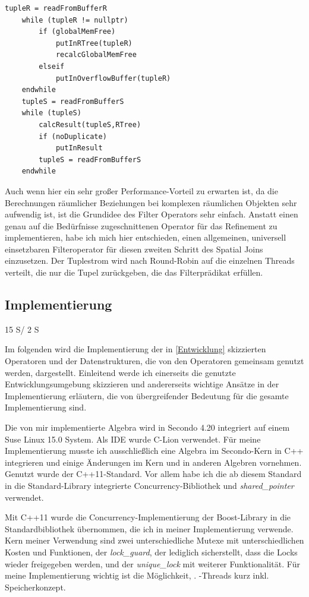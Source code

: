 \documentclass[a4paper,12pt,twoside]{article}
\newcommand{\Fb}[1]{\textit{#1}} %
\begin{document}
\begin{minipage}{\linewidth}
	\begin{lstlisting}[caption={Spatial Join: Worker}, label=list:spatialJoin]
	tupleR = readFromBufferR 
	while (tupleR != nullptr)
		if (globalMemFree)
			putInRTree(tupleR)
			recalcGlobalMemFree
		elseif
			putInOverflowBuffer(tupleR)
	endwhile
	tupleS = readFromBufferS
	while (tupleS)
		calcResult(tupleS,RTree)
		if (noDuplicate)
			putInResult
		tupleS = readFromBufferS
	endwhile
	\end{lstlisting}
\end{minipage}

Auch wenn hier ein sehr großer Performance-Vorteil zu erwarten ist, da die Berechnungen räumlicher Beziehungen bei komplexen räumlichen Objekten sehr aufwendig ist, ist die Grundidee des Filter Operators sehr einfach. Anstatt einen genau auf die Bedürfnisse zugeschnittenen Operator für das Refinement zu implementieren, habe ich mich hier entschieden, einen allgemeinen, universell einsetzbaren Filteroperator für diesen zweiten Schritt des Spatial Joins einzusetzen. Der Tuplestrom wird nach Round-Robin auf die einzelnen Threads verteilt, die nur die Tupel zurückgeben, die das Filterprädikat erfüllen.

\subsection{Implementierung} 15 S/ 2 S
\label{Implemeniterung} 

Im folgenden wird die Implementierung der in \autoref{Entwicklung} skizzierten Operatoren und der Datenstrukturen, die von den Operatoren gemeinsam genutzt werden, dargestellt. Einleitend werde ich einerseits die genutzte Entwicklungsumgebung skizzieren und andererseits wichtige Ansätze in der Implementierung erläutern, die von übergreifender Bedeutung für die gesamte Implementierung sind.

Die von mir implementierte Algebra wird in Secondo 4.20 integriert auf einem Suse Linux 15.0 System. Als IDE wurde C-Lion verwendet. Für meine Implementierung musste ich ausschließlich eine Algebra im Secondo-Kern in C++ integrieren und einige Änderungen im Kern und in anderen Algebren vornehmen. Genutzt wurde der C++11-Standard. Vor allem habe ich die ab diesem Standard in die Standard-Library integrierte Concurrency-Bibliothek und \Fb{shared\_pointer} verwendet.

Mit C++11 wurde die Concurrency-Implementierung der Boost-Library in die Standardbibliothek übernommen, die ich in meiner Implementierung verwende. Kern meiner Verwendung sind zwei unterschiedliche Mutexe mit unterschiedlichen Kosten und Funktionen, der \Fb{lock\_guard}, der lediglich sicherstellt, dass die Locks wieder freigegeben werden, und der \Fb{unique\_lock} mit weiterer Funktionalität. Für meine Implementierung wichtig ist die Möglichkeit, . -Threads kurz inkl. Speicherkonzept.
\end{document}
